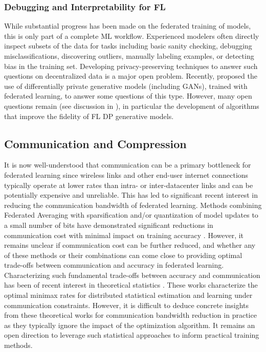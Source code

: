 \documentclass[11pt]{article}
\newcommand{\sketch}[1]{[{\color{darkgreen}{\emph{#1}}}]}
\begin{document}
\subsubsection{Debugging and Interpretability for FL}
\label{subsec:debugging-and-interpretability-for-fl}
While substantial progress has been made on the federated training of models, this is only part of a complete ML workflow. Experienced modelers often directly inspect subsets of the data for tasks including basic sanity checking, debugging misclassifications, discovering outliers, manually labeling examples, or detecting bias in the training set. Developing privacy-preserving techniques to answer such questions on decentralized data is a major open problem. Recently, \citet{augenstein2019generative} proposed the use of differentially private generative models (including GANs), trained with federated learning, to answer some questions of this type. However, many open questions remain (see discussion in \citep{augenstein2019generative}), in particular the development of algorithms that improve the fidelity of FL DP generative models. 


\subsection{Communication and Compression}\label{sec:compr}

It is now well-understood that communication can be a primary bottleneck for federated learning since wireless links and other end-user internet connections typically operate at lower rates than intra- or inter-datacenter links and can be potentially expensive and unreliable. This has led to significant recent interest in reducing the communication bandwidth of federated learning. Methods combining Federated Averaging with sparsification and/or quantization of model updates to a small number of bits have demonstrated significant reductions in communication cost with minimal impact on training accuracy \citep{konevcny2016federated}. However, it remains unclear if communication cost can be further reduced, and whether any of these methods or their combinations can come close to providing optimal trade-offs between communication and accuracy in federated learning. Characterizing such fundamental trade-offs between accuracy and communication has been of recent interest in theoretical statistics \citep{duchi2013,braverman2016, han2018,  acharya2018, barnes2019, tang2019texttt, Barnes2020rtopk}. These works characterize the optimal minimax rates for distributed statistical estimation and learning under communication constraints. However, it is difficult to deduce  concrete insights from these theoretical works for communication bandwidth reduction in practice as they typically ignore the impact of the optimization algorithm. It remains an open direction to leverage such statistical approaches to inform practical training methods.
\end{document}

